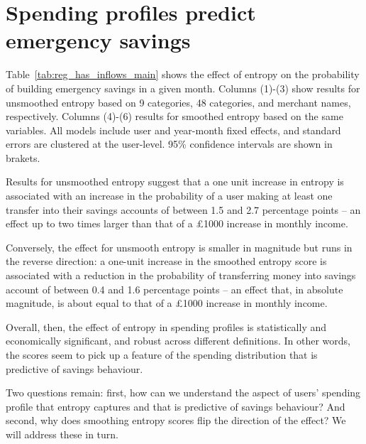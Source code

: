 
\section{Spending profiles predict emergency savings}%
\label{sec:results}

Table~\ref{tab:reg_has_inflows_main} shows the effect of entropy on the
probability of building emergency savings in a given month. Columns (1)-(3)
show results for unsmoothed entropy based on 9 categories, 48 categories, and
merchant names, respectively. Columns (4)-(6) results for smoothed entropy
based on the same variables. All models include user and year-month fixed
effects, and standard errors are clustered at the user-level. 95\% confidence
intervals are shown in brakets.




Results for unsmoothed entropy suggest that a one unit increase in entropy is
associated with an increase in the probability of a user making at least one
transfer into their savings accounts of between 1.5 and 2.7 percentage points
-- an effect up to two times larger than that of a \pounds1000 increase in
monthly income.

Conversely, the effect for unsmooth entropy is smaller in magnitude but runs in
the reverse direction: a one-unit increase in the smoothed entropy score is
associated with a reduction in the probability of transferring money into
savings account of between 0.4 and 1.6 percentage points -- an effect that, in
absolute magnitude, is about equal to that of a \pounds1000 increase in monthly
income.

Overall, then, the effect of entropy in spending profiles is statistically and
economically significant, and robust across different definitions. In other
words, the scores seem to pick up a feature of the spending distribution that
is predictive of savings behaviour.

Two questions remain: first, how can we understand the aspect of users'
spending profile that entropy captures and that is predictive of savings
behaviour? And second, why does smoothing entropy scores flip the direction of
the effect? We will address these in turn.




